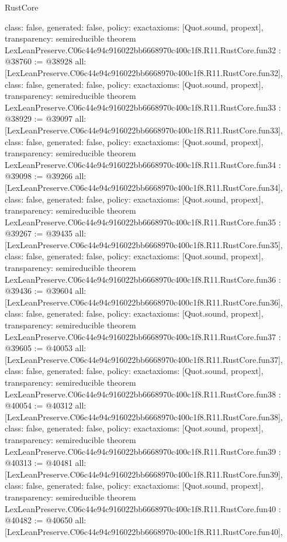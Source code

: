 \begin{lexlean}{RustCore}
\begin{coremodule}
{  class: false,
  generated: false,
  policy: exact{axioms: [Quot.sound, propext]},
  transparency: semireducible
}
theorem LexLeanPreserve.C06c44e94c916022bb6668970c400c1f8.R11.RustCore.fun32 : @38760 := @38928 {
  all: [LexLeanPreserve.C06c44e94c916022bb6668970c400c1f8.R11.RustCore.fun32],
  class: false,
  generated: false,
  policy: exact{axioms: [Quot.sound, propext]},
  transparency: semireducible
}
theorem LexLeanPreserve.C06c44e94c916022bb6668970c400c1f8.R11.RustCore.fun33 : @38929 := @39097 {
  all: [LexLeanPreserve.C06c44e94c916022bb6668970c400c1f8.R11.RustCore.fun33],
  class: false,
  generated: false,
  policy: exact{axioms: [Quot.sound, propext]},
  transparency: semireducible
}
theorem LexLeanPreserve.C06c44e94c916022bb6668970c400c1f8.R11.RustCore.fun34 : @39098 := @39266 {
  all: [LexLeanPreserve.C06c44e94c916022bb6668970c400c1f8.R11.RustCore.fun34],
  class: false,
  generated: false,
  policy: exact{axioms: [Quot.sound, propext]},
  transparency: semireducible
}
theorem LexLeanPreserve.C06c44e94c916022bb6668970c400c1f8.R11.RustCore.fun35 : @39267 := @39435 {
  all: [LexLeanPreserve.C06c44e94c916022bb6668970c400c1f8.R11.RustCore.fun35],
  class: false,
  generated: false,
  policy: exact{axioms: [Quot.sound, propext]},
  transparency: semireducible
}
theorem LexLeanPreserve.C06c44e94c916022bb6668970c400c1f8.R11.RustCore.fun36 : @39436 := @39604 {
  all: [LexLeanPreserve.C06c44e94c916022bb6668970c400c1f8.R11.RustCore.fun36],
  class: false,
  generated: false,
  policy: exact{axioms: [Quot.sound, propext]},
  transparency: semireducible
}
theorem LexLeanPreserve.C06c44e94c916022bb6668970c400c1f8.R11.RustCore.fun37 : @39605 := @40053 {
  all: [LexLeanPreserve.C06c44e94c916022bb6668970c400c1f8.R11.RustCore.fun37],
  class: false,
  generated: false,
  policy: exact{axioms: [Quot.sound, propext]},
  transparency: semireducible
}
theorem LexLeanPreserve.C06c44e94c916022bb6668970c400c1f8.R11.RustCore.fun38 : @40054 := @40312 {
  all: [LexLeanPreserve.C06c44e94c916022bb6668970c400c1f8.R11.RustCore.fun38],
  class: false,
  generated: false,
  policy: exact{axioms: [Quot.sound, propext]},
  transparency: semireducible
}
theorem LexLeanPreserve.C06c44e94c916022bb6668970c400c1f8.R11.RustCore.fun39 : @40313 := @40481 {
  all: [LexLeanPreserve.C06c44e94c916022bb6668970c400c1f8.R11.RustCore.fun39],
  class: false,
  generated: false,
  policy: exact{axioms: [Quot.sound, propext]},
  transparency: semireducible
}
theorem LexLeanPreserve.C06c44e94c916022bb6668970c400c1f8.R11.RustCore.fun40 : @40482 := @40650 {
  all: [LexLeanPreserve.C06c44e94c916022bb6668970c400c1f8.R11.RustCore.fun40],
}
\end{coremodule}
\end{lexlean}
